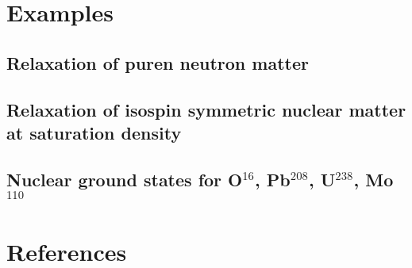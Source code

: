 \documentclass[3p]{elsarticle}
\begin{document}
\section{Examples}
\subsection{Relaxation of puren neutron matter}
\subsection{Relaxation of isospin symmetric nuclear matter at saturation density}
\subsection{Nuclear ground states for O$^{16}$, Pb$^{208}$, U$^{238}$, Mo$^{110}$}

\section*{References}


\end{document}
